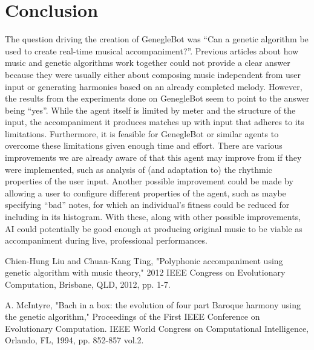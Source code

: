 \documentclass[conference]{IEEEtran}
\begin{document}

\section{Conclusion}

The question driving the creation of GenegleBot was “Can a genetic algorithm be used to create real-time musical accompaniment?”.  Previous articles about how music and genetic algorithms work together could not provide a clear answer because they were usually either about composing music independent from user input or generating harmonies based on an already completed melody.  However, the results from the experiments done on GenegleBot seem to point to the answer being “yes”.  While the agent itself is limited by meter and the structure of the input, the accompaniment it produces matches up with input that adheres to its limitations.  Furthermore, it is feasible for GenegleBot or similar agents to overcome these limitations given enough time and effort. There are various improvements we are already aware of that this agent may improve from if they were implemented, such as analysis of (and adaptation to) the rhythmic properties of the user input. Another possible improvement could be made by allowing a user to configure different properties of the agent, such as maybe specifying “bad” notes, for which an individual’s fitness could be reduced for including in its histogram. With these, along with other possible improvements, AI could potentially be good enough at producing original music to be viable as accompaniment during live, professional performances.

\begin{thebibliography}{1}
	
	Chien-Hung Liu and Chuan-Kang Ting, "Polyphonic accompaniment using genetic algorithm with music theory," 2012 IEEE Congress on Evolutionary Computation, Brisbane, QLD, 2012, pp. 1-7.
		
	A. McIntyre, "Bach in a box: the evolution of four part Baroque harmony using the genetic algorithm," Proceedings of the First IEEE Conference on Evolutionary Computation. IEEE World Congress on Computational Intelligence, Orlando, FL, 1994, pp. 852-857 vol.2.
			
	
	
\end{thebibliography}

	
\end{document}
